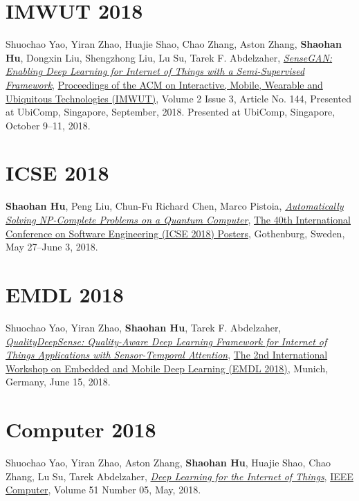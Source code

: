 \section{\sc IMWUT 2018}\hypertarget{yao2018imwut}{}
Shuochao Yao, Yiran Zhao, Huajie Shao, Chao Zhang, Aston Zhang, \textbf{Shaohan Hu}, Dongxin Liu, Shengzhong Liu, Lu Su, Tarek F. Abdelzaher,
\href{https://dl.acm.org/citation.cfm?id=3264954}{\emph{SenseGAN: Enabling Deep Learning for Internet of Things with a Semi-Supervised Framework}},
\href{https://imwut.acm.org/}{\textsf{Proceedings of the ACM on Interactive, Mobile, Wearable and Ubiquitous Technologies (IMWUT)}},
Volume 2 Issue 3, Article No. 144, Presented at UbiComp, Singapore, September, 2018.
Presented at UbiComp, Singapore, October 9--11, 2018.

\section{\sc ICSE 2018}\hypertarget{hu2018icse}{}
\textbf{Shaohan Hu}, Peng Liu, Chun-Fu Richard Chen, Marco Pistoia,
\href{https://dl.acm.org/citation.cfm?id=3194959}{\emph{Automatically Solving NP-Complete Problems on a Quantum Computer}},
\href{https://www.icse2018.org/track/icse-2018-Posters}{\textsf{The 40th International Conference on Software Engineering (ICSE 2018) Posters}},
Gothenburg, Sweden, May 27--June 3, 2018.

\section{\sc EMDL 2018}\hypertarget{yao2018emdl}{}
Shuochao Yao, Yiran Zhao, \textbf{Shaohan Hu}, Tarek F. Abdelzaher,
\href{https://dl.acm.org/citation.cfm?id=3212729}{\emph{QualityDeepSense: Quality-Aware Deep Learning Framework for Internet of Things Applications with Sensor-Temporal Attention}},
\href{https://www.sigmobile.org/mobisys/2018/workshops/deepmobile18/index.html}{\textsf{The 2nd International Workshop on Embedded and Mobile Deep Learning (EMDL 2018)}},
Munich, Germany, June 15, 2018.

\section{\sc Computer 2018}\hypertarget{yao2018computer}{}
Shuochao Yao, Yiran Zhao, Aston Zhang, \textbf{Shaohan Hu}, Huajie Shao, Chao Zhang, Lu Su, Tarek Abdelzaher,
\href{https://ieeexplore.ieee.org/document/8364644}{\emph{Deep Learning for the Internet of Things}},
\href{https://www.computer.org/csdl/magazines/co}{\textsf{IEEE Computer}},
Volume 51 Number 05, May, 2018.

